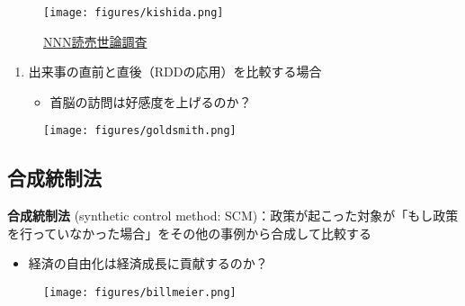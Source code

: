 \documentclass[
  xelatex,
  ja=standard]{bxjsarticle}
\providecommand{\tightlist}{%
  \setlength{\itemsep}{0pt}\setlength{\parskip}{0pt}}\usepackage{longtable,booktabs,array}
\begin{document}
\begin{figure}[htpb]

{\centering \texttt{[image: figures/kishida.png]}

}

\caption{\href{https://news.yahoo.co.jp/articles/b37de4c74732c92657c5d55d485852f611bc1540}{NNN読売世論調査}}

\end{figure}

\begin{enumerate}
\def\labelenumi{\arabic{enumi}.}
\setcounter{enumi}{1}
\tightlist
\item
  出来事の直前と直後（RDDの応用）を比較する場合

  \begin{itemize}
  \tightlist
  \item
    首脳の訪問は好感度を上げるのか？
  \end{itemize}
\end{enumerate}

\begin{figure}[htpb]

{\centering \texttt{[image: figures/goldsmith.png]}

}

\caption{\citet{goldsmith2021}}

\end{figure}

\hypertarget{ux5408ux6210ux7d71ux5236ux6cd5}{%
\subsection{合成統制法}\label{ux5408ux6210ux7d71ux5236ux6cd5}}

\textbf{合成統制法} (synthetic control method:
SCM)：政策が起こった対象が「もし政策を行っていなかった場合」をその他の事例から合成して比較する

\begin{itemize}
\tightlist
\item
  経済の自由化は経済成長に貢献するのか？
\end{itemize}

\begin{figure}[htpb]

{\centering \texttt{[image: figures/billmeier.png]}

}

\caption{\citet{billmeier2013}}

\end{figure}
\end{document}
